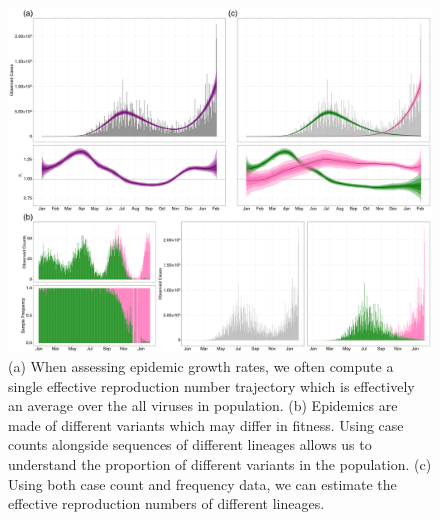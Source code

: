 \documentclass[12pt]{article}
\begin{document}
\begin{figure}
  \centering
  \includegraphics[width=\linewidth]{figs/fig_1.png}
  \caption{ (a) When assessing epidemic growth rates, we often compute a single effective reproduction number trajectory which is effectively an average over the all viruses in population.
    (b) Epidemics are made of different variants which may differ in fitness. Using case counts alongside sequences of different lineages allows us to understand the proportion of different variants in the population.
(c) Using both case count and frequency data, we can estimate the effective reproduction numbers of different lineages.}%
  \label{fig:1}
\end{figure}
\end{document}
